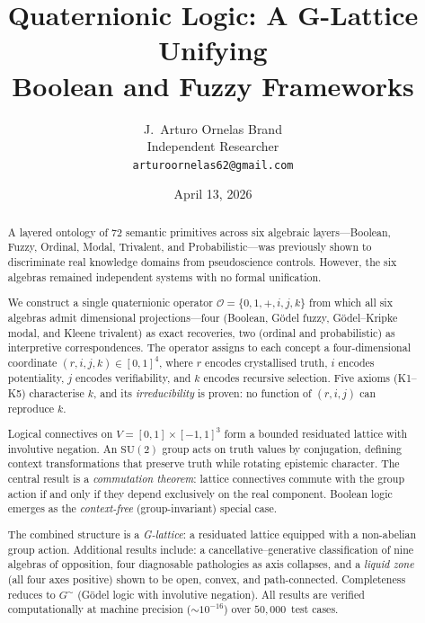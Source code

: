 \documentclass[11pt,a4paper]{article}
\title{Quaternionic Logic: A G-Lattice Unifying\\Boolean and Fuzzy Frameworks}
\author{J.~Arturo Ornelas Brand\\
  \small Independent Researcher\\
  \small \texttt{arturoornelas62@gmail.com}}
\date{April 13, 2026}
\newcommand{\Op}{\mathcal{O}}
\newcommand{\rey}[1]{{\color{rcolor}#1}}
\newcommand{\imag}[1]{{\color{icolor}#1}}
\newcommand{\exac}[1]{{\color{jcolor}#1}}
\newcommand{\recu}[1]{{\color{kcolor}#1}}
\newcommand{\SU}{\mathrm{SU}(2)}
\def\rey#1{#1}%
\def\imag#1{#1}%
\def\exac#1{#1}%
\def\recu#1{#1}%
\begin{document}
\maketitle

\begin{abstract}
A layered ontology of 72 semantic primitives across six algebraic
layers---Boolean, Fuzzy, Ordinal, Modal, Trivalent, and
Probabilistic---was previously shown to discriminate real knowledge
domains from pseudoscience controls. However, the six algebras
remained independent systems with no formal unification.

We construct a single quaternionic operator
$\Op=\{0,1,+,\imag{i},\exac{j},\recu{k}\}$ from which all six
algebras admit dimensional projections---four (Boolean, G\"odel
fuzzy, G\"odel--Kripke modal, and Kleene trivalent) as exact
recoveries, two (ordinal and probabilistic) as interpretive
correspondences. The operator
assigns to each concept a four-dimensional coordinate
$(\rey{r},\imag{i},\exac{j},\recu{k})\in[0,1]^4$, where $\rey{r}$
encodes crystallised truth, $\imag{i}$ encodes potentiality,
$\exac{j}$ encodes verifiability, and $\recu{k}$ encodes recursive
selection. Five axioms (K1--K5) characterise $\recu{k}$, and its
\emph{irreducibility} is proven: no function of
$(\rey{r},\imag{i},\exac{j})$ can reproduce $\recu{k}$.

Logical connectives on $V=[0,1]\times[-1,1]^3$ form a bounded
residuated lattice with involutive negation. An $\SU$ group acts on
truth values by conjugation, defining context transformations that
preserve truth while rotating epistemic character. The central result
is a \emph{commutation theorem}: lattice connectives commute with the
group action if and only if they depend exclusively on the real
component. Boolean logic emerges as the \emph{context-free}
(group-invariant) special case.

The combined structure is a \emph{G-lattice}: a residuated lattice
equipped with a non-abelian group action. Additional results include:
a cancellative--generative classification of nine algebras of
opposition, four diagnosable pathologies as axis collapses, and a
\emph{liquid zone} (all four axes positive) shown to be open, convex,
and path-connected. Completeness reduces to $G^\sim$ (G\"odel logic
with involutive negation). All results are verified computationally at
machine precision ($\sim10^{-16}$) over $50{,}000$~test cases.
\end{abstract}
\end{document}

